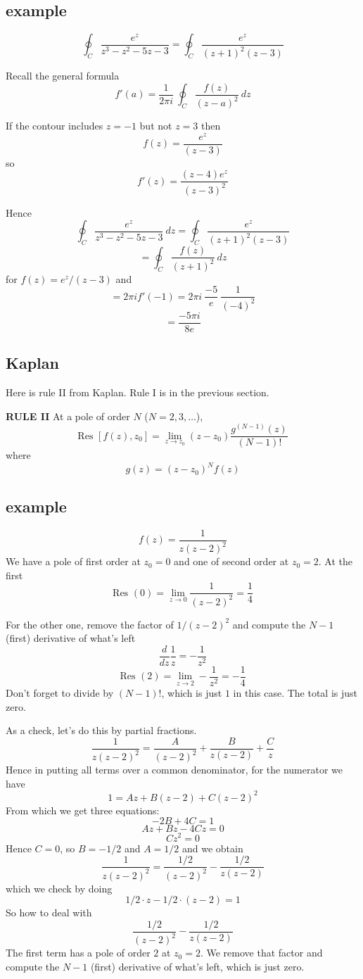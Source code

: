 \documentclass[11pt, oneside]{article}   	%
\begin{document}
\subsection*{example}
\[ \oint_C \frac{e^z}{z^3 - z^2 - 5z - 3} = \oint_C \frac{e^z}{(z+1)^2 (z-3)} \]

Recall the general formula
\[ f'(a) = \frac{1}{2 \pi i} \ \oint_C \frac{f(z)}{(z-a)^2} \ dz \]

If the contour includes $z = -1$ but not $z = 3$ then
\[ f(z) = \frac{e^z}{(z-3)} \]
so
\[ f'(z) = \frac{(z-4)e^z}{(z-3)^2} \]

Hence
\[ \oint_C \frac{e^z}{z^3 - z^2 - 5z - 3} \ dz = \oint_C \frac{e^z}{(z+1)^2 (z-3)} \]
\[ = \oint_C \frac{f(z)}{(z+1)^2} \ dz \]
for $f(z) = e^z/(z-3) $ and
\[ = 2 \pi i f'(-1) = 2 \pi i \ \frac{-5}{e} \ \frac{1}{(-4)^2} \]
\[ = \frac{-5 \pi i}{8 e}  \]

\subsection*{Kaplan}
Here is rule II from Kaplan.  Rule I is in the previous section.

\textbf{RULE II}  At a pole of order $N$ ($N = 2, 3, \dots$),
\[ \text{Res } [f(z),z_0] = \lim_{z \rightarrow z_0} (z-z_0) \frac{g^{(N-1)}(z)}{(N-1)!} \]
where 
\[ g(z) = (z-z_0)^N f(z) \]

\subsection*{example}
\[ f(z) = \frac{1}{z(z-2)^2} \]
We have a pole of first order at $z_0=0$ and one of second order at $z_0=2$.  At the first
\[ \text{Res }(0) = \lim_{z \rightarrow 0} \frac{1}{(z-2)^2} = \frac{1}{4} \]

For the other one, remove the factor of $1/(z-2)^2$ and compute the $N-1$ (first) derivative of what's left
\[ \frac{d}{dz} \frac{1}{z} =  - \frac{1}{z^2} \]
\[ \text{Res } (2) = \lim_{z \rightarrow 2} -\frac{1}{z^2} = -\frac{1}{4} \]
Don't forget to divide by $(N-1)!$, which is just $1$ in this case.  The total is just zero.

As a check, let's do this by partial fractions.
\[ \frac{1}{z(z-2)^2} = \frac{A}{(z-2)^2} +  \frac{B}{z(z-2)} +  \frac{C}{z}  \]
Hence in putting all terms over a common denominator, for the numerator we have
\[ 1 = Az + B(z-2) + C(z-2)^2 \]
From which we get three equations:
\[ -2B + 4C = 1 \]
\[ Az + Bz - 4Cz = 0 \]
\[ Cz^2 = 0 \]
Hence $C = 0$, so $B = -1/2$ and $A = 1/2$ and we obtain
\[ \frac{1}{z(z-2)^2} = \frac{1/2}{(z-2)^2} - \frac{1/2}{z(z-2)} \]
which we check by doing
\[ 1/2 \cdot z - 1/2 \cdot (z-2) = 1 \]
So how to deal with 
\[ \frac{1/2}{(z-2)^2} - \frac{1/2}{z(z-2)} \]
The first term has a pole of order $2$ at $z_0 = 2$.  We remove that factor and compute the $N-1$ (first) derivative of what's left, which is just zero.  
\end{document}
